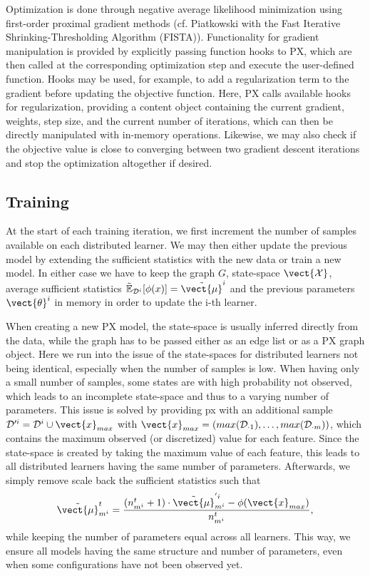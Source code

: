Optimization is done through negative average likelihood minimization using first-order proximal gradient methods (cf. Piatkowski \cite{piatkowski2018exponential} with the Fast Iterative Shrinking-Thresholding Algorithm (FISTA)).
Functionality for gradient manipulation is provided by explicitly passing function hooks to PX, which are then called at the corresponding optimization step and execute the user-defined function.
Hooks may be used, for example, to add a regularization term to the gradient before updating the objective function. 
Here, PX calls available hooks for regularization, providing a content object containing the current gradient, weights, step size, and the current number of iterations, which can then be directly manipulated with in-memory operations.
Likewise, we may also check if the objective value is close to converging between two gradient descent iterations and stop the optimization altogether if desired.

\subsection{Training}
At the start of each training iteration, we first increment the number of samples available on each distributed learner. 
We may then either update the previous model by extending the sufficient statistics with the new data or train a new model. 
In either case we  have to keep the graph $G$, state-space $\vect{\mathcal{X}}$, average sufficient statistics $\tilde{\mathbb{E}}_{\mathcal{D}^i}[\phi(x)] = \tilde{\vect{\mu}}^i$ and the previous parameters $\vect{\theta}^i$ in memory in order to update the i-th learner.

When creating a new PX model, the state-space is usually inferred directly from the data, while the graph has to be passed either as an edge list or as a PX graph object. 
Here we run into the issue of the state-spaces for distributed learners not being identical, especially when the number of samples is low. 
When having only a small number of samples, some states are with high probability not observed, which leads to an incomplete state-space and thus to a varying number of parameters. 
This issue is solved by providing px with an additional sample $\mathcal{D}'^i = \mathcal{D}^i \cup \vect{x}_{max}$ with $\vect{x}_{max} = (max(\mathcal{D}_{\cdot 1}), \ldots, max(\mathcal{D}_{\cdot m}))$, which contains the maximum observed (or discretized) value for each feature.
Since the state-space is created by taking the maximum value of each feature, this leads to all distributed learners having the same number of parameters.
Afterwards, we simply remove scale back the sufficient statistics such that
\begin{equation}
    \tilde{\vect{\mu}}^t_{m^i} = \frac{(n^t_{m^i} + 1) \cdot \tilde{\vect{\mu}}^{'i}_{m^i} - \phi(\vect{x}_{max})}{n^t_{m^{i}}},
\end{equation}
while keeping the number of parameters equal across all learners.
This way, we ensure all models having the same structure and number of parameters, even when some configurations have not been observed yet.

